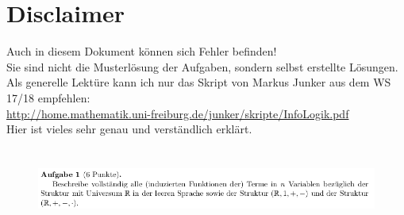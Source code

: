 \documentclass[a4paper]{scrartcl}
\begin{document}
\section*{Disclaimer}%
\label{sec:disclaimer}
Auch in diesem Dokument können sich Fehler befinden!\\
Sie sind nicht die Musterlösung der Aufgaben, sondern selbst erstellte Lösungen.\\

Als generelle Lektüre kann ich nur das Skript von Markus Junker aus dem WS 17/18 empfehlen:\\
\url{http://home.mathematik.uni-freiburg.de/junker/skripte/InfoLogik.pdf}\\
Hier ist vieles sehr genau und verständlich erklärt.

\section*{}%
\label{sec:aufgabe_1}
    \begin{figure}[H]
        \centering
        \includegraphics[scale=0.6]{./A-1.png}
        \label{fig:}
    \end{figure} 
\end{document}
